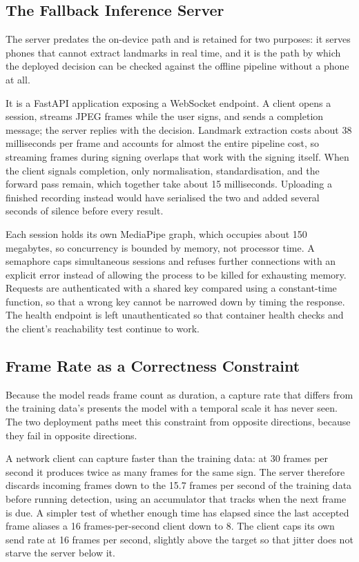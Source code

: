 \subsection{The Fallback Inference Server}

The server predates the on-device path and is retained for two purposes: it serves phones that cannot extract landmarks in real time, and it is the path by which the deployed decision can be checked against the offline pipeline without a phone at all.

It is a FastAPI application exposing a WebSocket endpoint. A client opens a session, streams JPEG frames while the user signs, and sends a completion message; the server replies with the decision. Landmark extraction costs about 38 milliseconds per frame and accounts for almost the entire pipeline cost, so streaming frames during signing overlaps that work with the signing itself. When the client signals completion, only normalisation, standardisation, and the forward pass remain, which together take about 15 milliseconds. Uploading a finished recording instead would have serialised the two and added several seconds of silence before every result.

Each session holds its own MediaPipe graph, which occupies about 150 megabytes, so concurrency is bounded by memory, not processor time. A semaphore caps simultaneous sessions and refuses further connections with an explicit error instead of allowing the process to be killed for exhausting memory. Requests are authenticated with a shared key compared using a constant-time function, so that a wrong key cannot be narrowed down by timing the response. The health endpoint is left unauthenticated so that container health checks and the client's reachability test continue to work.

\subsection{Frame Rate as a Correctness Constraint}
\label{sec:framerate}

Because the model reads frame count as duration, a capture rate that differs from the training data's presents the model with a temporal scale it has never seen. The two deployment paths meet this constraint from opposite directions, because they fail in opposite directions.

A network client can capture faster than the training data: at 30 frames per second it produces twice as many frames for the same sign. The server therefore discards incoming frames down to the 15.7 frames per second of the training data before running detection, using an accumulator that tracks when the next frame is due. A simpler test of whether enough time has elapsed since the last accepted frame aliases a 16 frames-per-second client down to 8. The client caps its own send rate at 16 frames per second, slightly above the target so that jitter does not starve the server below it.

